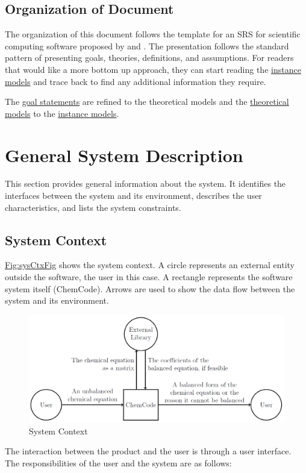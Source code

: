\documentclass[12pt]{article}
\begin{document}
\subsection{Organization of Document}
\label{Sec:DocOrg}
The organization of this document follows the template for an SRS for scientific computing software proposed by \cite{koothoor2013} and \cite{smithLai2005}. The presentation follows the standard pattern of presenting goals, theories, definitions, and assumptions. For readers that would like a more bottom up approach, they can start reading the \hyperref[Sec:IMs]{instance models} and trace back to find any additional information they require.

The \hyperref[Sec:GoalStmt]{goal statements} are refined to the theoretical models and the \hyperref[Sec:TMs]{theoretical models} to the \hyperref[Sec:IMs]{instance models}.

\section{General System Description}
\label{Sec:GenSysDesc}
This section provides general information about the system. It identifies the interfaces between the system and its environment, describes the user characteristics, and lists the system constraints.

\subsection{System Context}
\label{Sec:SysContext}
\hyperref[Figure:sysCtxFig]{Fig:sysCtxFig} shows the system context. A circle represents an external entity outside the software, the user in this case. A rectangle represents the software system itself (ChemCode). Arrows are used to show the data flow between the system and its environment.

\begin{figure}
\begin{center}
\includegraphics[width=\textwidth]{../../../../datafiles/chemcode/sysCtxFig.png}
\caption{System Context}
\label{Figure:sysCtxFig}
\end{center}
\end{figure}
The interaction between the product and the user is through a user interface. The responsibilities of the user and the system are as follows:
\end{document}
